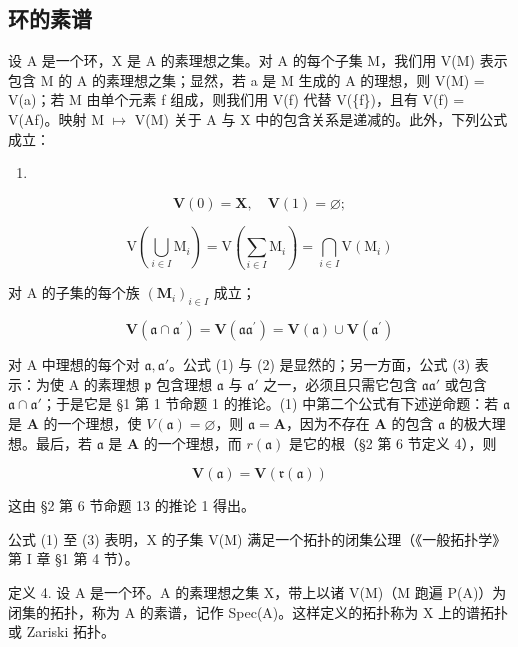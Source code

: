 \subsection{环的素谱}

设 A 是一个环，X 是 A 的素理想之集。对 A 的每个子集 M，我们用 V(M) 表示包含 M 的 A 的素理想之集；显然，若 a 是 M 生成的 A 的理想，则 V(M) = V(a)；若 M 由单个元素 f 组成，则我们用 V(f) 代替 V(\{f\})，且有 V(f) = V(Af)。映射 M \(\mapsto\) V(M) 关于 A 与 X 中的包含关系是递减的。此外，下列公式成立：

\begin{enumerate}
\def\labelenumi{(\arabic{enumi})}
\tightlist
\item
\end{enumerate}

\[
\mathbf {V} (0) = \mathbf {X}, \quad \mathbf {V} (1) = \varnothing ;\tag{1}
\]

\[
\mathrm{V} \left(\bigcup_ {i \in I} \mathrm{M} _ {i}\right) = \mathrm{V} \left(\sum_ {i \in I} \mathrm{M} _ {i}\right) = \bigcap_ {i \in I} \mathrm{V} (\mathrm{M} _ {i})\tag{2}
\]

对 A 的子集的每个族 \((\mathbf{M}_i)_{i\in I}\) 成立；

\[
\mathbf {V} (\mathfrak {a} \cap \mathfrak {a} ^ {\prime}) = \mathbf {V} (\mathfrak {a a} ^ {\prime}) = \mathbf {V} (\mathfrak {a}) \cup \mathbf {V} (\mathfrak {a} ^ {\prime})\tag{3}
\]

对 A 中理想的每个对 \(\mathfrak{a},\mathfrak{a}'\)。公式 (1) 与 (2) 是显然的；另一方面，公式 (3) 表示：为使 A 的素理想 \(\mathfrak{p}\) 包含理想 \(\mathfrak{a}\) 与 \(\mathfrak{a}'\) 之一，必须且只需它包含 \(\mathfrak{a}\mathfrak{a}'\) 或包含 \(\mathfrak{a} \cap \mathfrak{a}'\)；于是它是 §1 第 1 节命题 1 的推论。(1) 中第二个公式有下述逆命题：若 \(\mathfrak{a}\) 是 \(\mathbf{A}\) 的一个理想，使 \(V(\mathfrak{a}) = \varnothing\)，则 \(\mathfrak{a} = \mathbf{A}\)，因为不存在 \(\mathbf{A}\) 的包含 \(\mathfrak{a}\) 的极大理想。最后，若 \(\mathfrak{a}\) 是 \(\mathbf{A}\) 的一个理想，而 \(r(\mathfrak{a})\) 是它的根（§2 第 6 节定义 4），则

\[
\mathbf {V} (\mathfrak {a}) = \mathbf {V} (\mathfrak {r} (\mathfrak {a}))\tag{4}
\]

这由 §2 第 6 节命题 13 的推论 1 得出。

公式 (1) 至 (3) 表明，X 的子集 V(M) 满足一个拓扑的闭集公理（《一般拓扑学》第 I 章 §1 第 4 节）。

定义 4. 设 A 是一个环。A 的素理想之集 X，带上以诸 V(M)（M 跑遍 P(A)）为闭集的拓扑，称为 A 的素谱，记作 Spec(A)。这样定义的拓扑称为 X 上的谱拓扑或 Zariski 拓扑。

